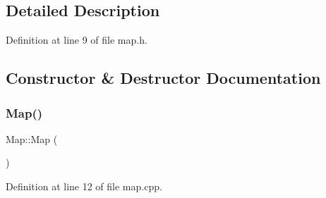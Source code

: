 \subsection{Detailed Description}


Definition at line 9 of file map.\+h.



\subsection{Constructor \& Destructor Documentation}
\mbox{\label{class_map_a0f5ad0fd4563497b4214038cbca8b582}} 
\subsubsection{\texorpdfstring{Map()}{Map()}}
{\footnotesize\ttfamily Map\+::\+Map (\begin{DoxyParamCaption}{ }\end{DoxyParamCaption})}



Definition at line 12 of file map.\+cpp.



